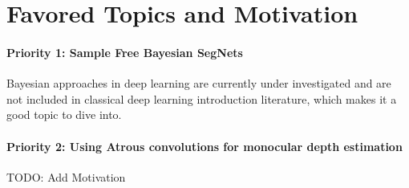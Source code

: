\documentclass[11pt,english]{article}
\begin{document}
\section{Favored Topics and Motivation}
\paragraph{Priority 1: Sample Free Bayesian SegNets} Bayesian approaches in deep learning are currently under investigated and are not included in classical deep learning introduction literature, which makes it a good topic to dive into.
\paragraph{Priority 2: Using Atrous convolutions for monocular depth estimation} TODO: Add Motivation



\end{document}
